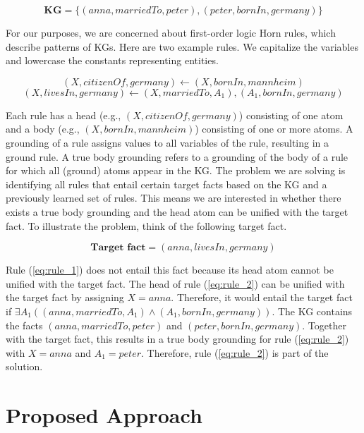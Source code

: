 \documentclass[english]{lni}
\begin{document}
\begin{equation*} \label{eq:knowledgegraph}
\textbf{KG} = \{(anna,marriedTo, peter), (peter,bornIn,germany)\}\end{equation*}

For our purposes, we are concerned about first-order logic Horn rules, which describe patterns of KGs. Here are two example rules. We capitalize the variables and lowercase the constants representing entities.

\begin{equation} \label{eq:rule_1}
(X, citizenOf, germany) \leftarrow (X, bornIn, mannheim) 
\end{equation} 
\begin{equation} \label{eq:rule_2}
(X, livesIn, germany) \leftarrow (X, marriedTo, A_1), (A_1, bornIn, germany)
\end{equation}

Each rule has a head (e.g., \((X, citizenOf, germany)\)) consisting of one atom and a body (e.g., \((X, 
bornIn, mannheim)\)) consisting of one or more atoms. A grounding of a rule assigns values to all variables of the rule, resulting in a ground rule. A true body grounding refers to a grounding of the body of a rule for which all (ground) atoms appear in the KG. The problem we are solving is identifying all rules that entail certain target facts based on the KG and a previously learned set of rules. This means we are interested in whether there exists a true body grounding and the head atom can be unified with the target fact. To illustrate the problem, think of the following target fact.

\begin{equation*} \label{eq:target_1}
\textbf{Target fact} = (anna, livesIn, germany)
\end{equation*}


Rule (\ref{eq:rule_1}) does not entail this fact because its head atom cannot be unified with the target fact.
The head of rule (\ref{eq:rule_2}) can be unified with the target fact by assigning \(X = anna\). Therefore, it would entail the target fact if \(\exists A_1 ((anna, marriedTo, A_1) \wedge (A_1, bornIn, germany))\). The KG contains the facts \((anna, marriedTo, peter)\) and \((peter, bornIn, germany)\). Together with the target fact, this results in a true body grounding for rule (\ref{eq:rule_2}) with \(X = anna\) and \(A_1 = peter\). Therefore, rule (\ref{eq:rule_2}) is part of the solution.

\section{Proposed Approach}
\end{document}

